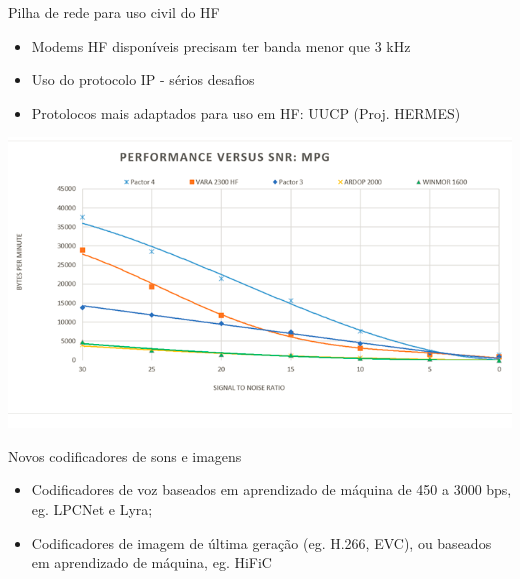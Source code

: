\begin{frame}
  \begin{block}{Pilha de rede para uso civil do HF}
    \begin{itemize}
      \item Modems HF disponíveis precisam ter banda menor que 3 kHz
      \item Uso do protocolo IP - sérios desafios
      \item Protolocos mais adaptados para uso em HF: UUCP (Proj. HERMES)
    \end{itemize}
  \end{block}

  \begin{center}
    \includegraphics[width=.65\columnwidth]{image_modems.png}
  \end{center}

\end{frame}

\begin{frame}
  \begin{block}{Novos codificadores de sons e imagens}
    \begin{itemize}
      \item Codificadores de voz baseados em aprendizado de máquina de 450 a 3000 bps, eg. LPCNet e Lyra;
      \item Codificadores de imagem de última geração
        (eg. H.266, EVC), ou baseados em aprendizado de máquina, eg. HiFiC
    \end{itemize}
  \end{block}

\end{frame}



